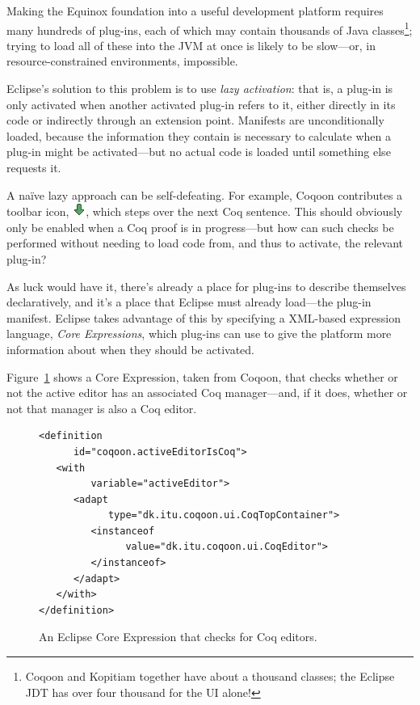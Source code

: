 \documentclass{article}
\newcommand{\fdef}[1]{\textit{#1}}
\begin{document}
Making the Equinox foundation into a useful development platform requires many
hundreds of plug-ins, each of which may contain thousands of Java
classes\footnote{Coqoon and Kopitiam together have about a thousand classes;
the Eclipse JDT has over four thousand for the UI alone!}; trying to load all
of these into the JVM at once is likely to be slow---or, in
resource-constrained environments, impossible.

Eclipse's solution to this problem is to use \fdef{lazy activation}: that is,
a plug-in is only activated when another activated plug-in refers to it, either
directly in its code or indirectly through an extension point. Manifests are
unconditionally loaded, because the information they contain is necessary to
calculate when a plug-in might be activated---but no actual code is loaded
until something else requests it.

A naïve lazy approach can be self-defeating. For example, Coqoon contributes a
toolbar icon, \includegraphics[scale=0.5]{down.png}, which steps over the
next Coq sentence. This should obviously only be enabled when a Coq proof is in
progress---but how can such checks be performed without needing to load code
from, and thus to activate, the relevant plug-in?

As luck would have it, there's already a place for plug-ins to describe
themselves declaratively, and it's a place that Eclipse must already load---the
plug-in manifest. Eclipse takes advantage of this by specifying a XML-based
expression language, \fdef{Core Expressions}, which plug-ins can use to give
the platform more information about when they should be activated.

Figure~\ref{fig:edexpr} shows a Core Expression, taken from Coqoon, that checks
whether or not the active editor has an associated Coq manager---and, if it
does, whether or not that manager is also a Coq editor.

\begin{figure}[h]
\begin{lstlisting}[basicstyle=\footnotesize\ttfamily]
<definition
      id="coqoon.activeEditorIsCoq">
   <with
         variable="activeEditor">
      <adapt
            type="dk.itu.coqoon.ui.CoqTopContainer">
         <instanceof
               value="dk.itu.coqoon.ui.CoqEditor">
         </instanceof>
      </adapt>
   </with>
</definition>
\end{lstlisting}
\caption{An Eclipse Core Expression that checks for Coq editors.}
\label{fig:edexpr}
\end{figure}
\end{document}
